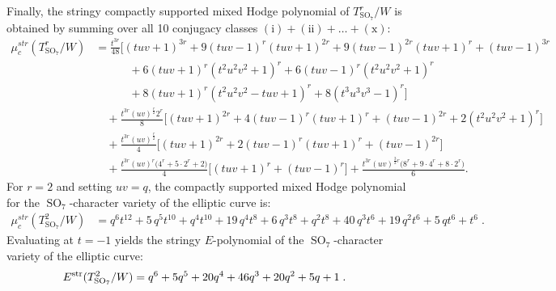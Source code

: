 \documentclass[11pt,english]{amsart}
\numberwithin{equation}{section}
\numberwithin{figure}{section}
\theoremstyle{plain}
\theoremstyle{plain}
\theoremstyle{definition}
\theoremstyle{remark}
\newcommand{\SO}{\operatorname{SO}}
\newcommand{\str}{\textup{str}}
\begin{document}
\vspace{-0.3cm}
Finally, the stringy compactly supported mixed Hodge polynomial of $T_{\SO_7}^r/W$ is obtained by summing over all 10 conjugacy classes $(\textrm{i}) + (\textrm{ii}) + \dots + (\textrm{x})$:
\begin{align*}
\mu_c^{str}(T_{\SO_7}^r/W)&= \frac{t^{3r}}{48} \Big[ (tuv+1)^{3r} + 9(tuv-1)^r (tuv+1)^{2r} + 9(tuv-1)^{2r} (tuv+1)^r + (tuv-1)^{3r} \\
&\qquad\quad + 6(tuv+1)^r (t^2 u^2 v^2 + 1)^r + 6(tuv-1)^r (t^2 u^2 v^2 + 1)^r \\
&\qquad\quad + 8(tuv+1)^r (t^2 u^2 v^2 - tuv + 1)^r + 8(t^3 u^3 v^3 - 1)^r \Big] \\
&\quad + \frac{t^{3r}(uv)^{\frac{r}{2}} 2^r}{8} \Big[ (tuv+1)^{2r} + 4(tuv-1)^r(tuv+1)^r + (tuv-1)^{2r} + 2(t^2 u^2 v^2 + 1)^r \Big] \\
&\quad + \frac{t^{3r}(uv)^{\frac{r}{2}}}{4} \Big[ (tuv+1)^{2r} + 2(tuv-1)^r(tuv+1)^r + (tuv-1)^{2r} \Big] \\
&\quad + \frac{t^{3r}(uv)^r \big(4^r + 5 \cdot 2^r + 2\big)}{4} \Big[ (tuv+1)^r + (tuv-1)^r \Big] + \frac{t^{3r}(uv)^{\frac{3}{2}r} \big(8^r + 9 \cdot 4^r + 8 \cdot 2^r\big)}{6}.
\end{align*}
For $r=2$ and setting $uv=q$, the compactly supported mixed Hodge polynomial for the $\SO_7$-character variety of the elliptic curve is:
\begin{align*}
\mu_c^{str}(T_{\SO_7}^2/W) &= q^{6} t^{12} + 5 \, q^{5} t^{10} + q^{4} t^{10} + 19 \, q^{4} t^{8} + 6 \, q^{3} t^{8} + q^{2} t^{8} + 40 \, q^{3} t^{6} + 19 \, q^{2} t^{6} + 5 \, q t^{6} + t^{6}\; .
\end{align*}
Evaluating at $t = -1$ yields the stringy $E$-polynomial of the $\SO_7$-character variety of the elliptic curve:
\begin{align*}
E^\str(T_{\SO_7}^2/W) &= q^6 + 5q^5 + 20q^4 + 46q^3 + 20q^2 + 5q + 1\; .
\end{align*}
\end{document}
